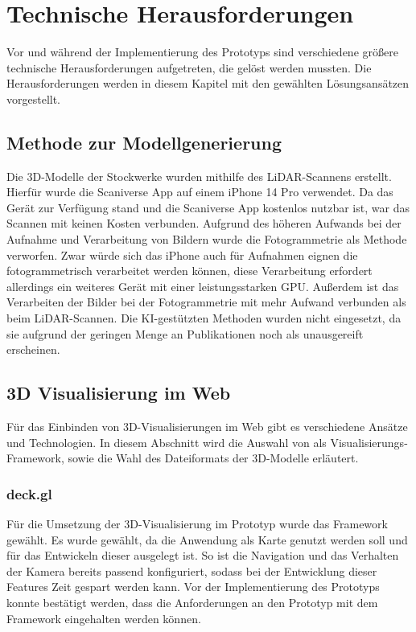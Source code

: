 \newpage
\section{Technische Herausforderungen}
Vor und während der Implementierung des Prototyps sind verschiedene größere technische Herausforderungen aufgetreten, die gelöst werden mussten. Die Herausforderungen werden in diesem Kapitel mit den gewählten Lösungsansätzen vorgestellt. 

\subsection{Methode zur Modellgenerierung}
Die 3D-Modelle der Stockwerke wurden mithilfe des LiDAR-Scannens erstellt. Hierfür wurde die Scaniverse App auf einem iPhone 14 Pro verwendet. Da das Gerät zur Verfügung stand und die Scaniverse App kostenlos nutzbar ist, war das Scannen mit keinen Kosten verbunden. Aufgrund des höheren Aufwands bei der Aufnahme und Verarbeitung von Bildern wurde die Fotogrammetrie als Methode verworfen. Zwar würde sich das iPhone auch für Aufnahmen eignen die fotogrammetrisch verarbeitet werden können, diese Verarbeitung erfordert allerdings ein weiteres Gerät mit einer leistungsstarken \ac{GPU}. Außerdem ist das Verarbeiten der Bilder bei der Fotogrammetrie mit mehr Aufwand verbunden als beim \ac{LiDAR}-Scannen. Die \ac{KI}-gestützten Methoden wurden nicht eingesetzt, da sie aufgrund der geringen Menge an Publikationen noch als unausgereift erscheinen.

\subsection{3D Visualisierung im Web}
Für das Einbinden von 3D-Visualisierungen im Web gibt es verschiedene Ansätze und Technologien. In diesem Abschnitt wird die Auswahl von \deckgl{} als Visualisierungs-Framework, sowie die Wahl des Dateiformats der 3D-Modelle erläutert.

\subsubsection{deck.gl}
Für die Umsetzung der 3D-Visualisierung im Prototyp wurde das Framework \deckgl{} gewählt. Es wurde gewählt, da die Anwendung als Karte genutzt werden soll und \deckgl{} für das Entwickeln dieser ausgelegt ist. So ist die Navigation und das Verhalten der Kamera bereits passend konfiguriert, sodass bei der Entwicklung dieser Features Zeit gespart werden kann. Vor der Implementierung des Prototyps konnte bestätigt werden, dass die Anforderungen an den Prototyp mit dem Framework eingehalten werden können.

